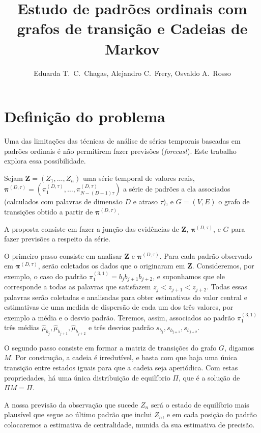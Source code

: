 \documentclass[10pt]{article}
\title{Estudo de padrões ordinais com grafos de transição e Cadeias de Markov}
\author{
	Eduarda T.\ C.\ Chagas\inst{1}, 
	Alejandro C.\ Frery,
	Osvaldo A.\ Rosso
}
\begin{document}
\maketitle

\section*{\centering Definição do problema} \label{abstract}

Uma das limitações das técnicas de análise de séries temporais baseadas em padrões ordinais é não permitirem fazer previsões (\textit{forecast}).
Este trabalho explora essa possibilidade.

Sejam $\bm Z=(Z_1,\dots,Z_n)$ uma série temporal de valores reais,
$\bm \pi^{(D,\tau)} = (\pi^{(D,\tau)}_1,\dots,\pi^{(D,\tau)}_{N-(D-1)\tau})$ a série de padrões a ela associados (calculados com palavras de dimensão $D$ e atraso $\tau$),
e $G=(V,E)$ o grafo de transições obtido a partir de $\bm \pi^{(D,\tau)}$.

A proposta consiste em fazer a junção das evidências de $\bm Z$, $\bm \pi^{(D,\tau)}$, e $G$ para fazer previsões a respeito da série.

O primeiro passo consiste em analisar $\bm Z$ e $\bm \pi^{(D,\tau)}$.
Para cada padrão observado em $\bm \pi^{(D,\tau)}$, serão coletados os dados que o originaram em $\bm Z$.
Consideremos, por exemplo, o caso do padrão $\pi^{(3,1)}_1=b_{j}b_{j+1}b_{j+2}$, e suponhamos que ele corresponde a todas as palavras que satisfazem $z_{j}<z_{j+1}<z_{j+2}$.
Todas essas palavras serão coletadas e analisadas para obter estimativas do valor central e estimativas de uma medida de dispersão de cada um dos três valores, por exemplo a média e o desvio padrão.
Teremos, assim, associados ao padrão $\pi^{(3,1)}_1$ três médias $\widehat\mu_{b_j}, \widehat\mu_{b_{j+1}}, \widehat\mu_{b_{j+2}}$ e três desvios padrão $s_{b_j}, s_{b_{j+1}}, s_{b_{j+2}}$.

O segundo passo consiste em formar a matriz de transições do grafo $G$, digamos $M$.
Por construção, a cadeia é irredutível, e basta com que haja uma única transição entre estados iguais para que a cadeia seja aperiódica.
Com estas propriedades, há uma única distribuição de equilíbrio $\Pi$, que é a solução de $\Pi M=\Pi$.

A nossa previsão da observação que sucede $Z_n$ será o estado de equilíbrio mais plausível que segue ao último padrão que inclui $Z_n$, e em cada posição do padrão colocaremos a estimativa de centralidade, munida da sua estimativa de precisão.



\end{document}
